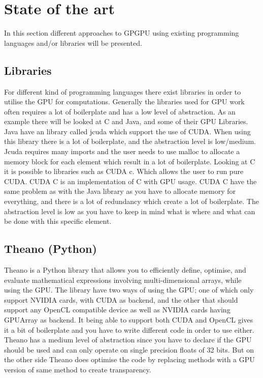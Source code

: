 \section{State of the art} %
\label{sec:state_of_the_art}
In this section different approaches to GPGPU using existing programming languages and/or libraries will be presented.
      
\subsection{Libraries} 
For different kind of programming languages there exist libraries in order to utilise the GPU for computations.
Generally the libraries used for GPU work often requires a lot of boilerplate and has a low level of abstraction.
As an example there will be looked at C and Java, and some of their GPU Libraries.
Java have an library called jcuda which support the use of CUDA.
When using this library there is a lot of boilerplate, and the abstraction level is low/medium\citep{Java_library}. 
Jcuda requires many imports and the user needs to use malloc to allocate a memory block for each element which result in a lot of boilerplate.\citep{Java_malloc}
Looking at C it is possible to libraries such as CUDA c. Which allows the user to run pure CUDA.
CUDA C is an implementation of C with GPU usage.
CUDA C have the same problem as with the Java library as you have to allocate memory for everything, and there is a lot of redundancy which create a lot of boilerplate.
The abstraction level is low as you have to keep in mind what is where and what can be done with this specific element.\citep{C_CUDA}
                                                  

\subsection{Theano (Python)}
Theano is a Python library that allows you to efficiently define, optimise, and evaluate mathematical expressions involving multi-dimensional arrays, while using the GPU.
The library have two ways of using the GPU; one of which only support NVIDIA cards, with CUDA as backend, and the other that should support any OpenCL compatible device as well as NVIDIA cards having GPUArray as backend.
It being able to support both CUDA and OpenCL gives it a bit of boilerplate and you have to write different code in order to use either.
Theano has a medium level of abstraction since you have to declare if the GPU should be used and can only operate on single precision floats of 32 bits.
But on the other side Theano does optimise the code by replacing methods with a GPU version of same method to create transparency.\citep{Theano,Theano_GPU}

